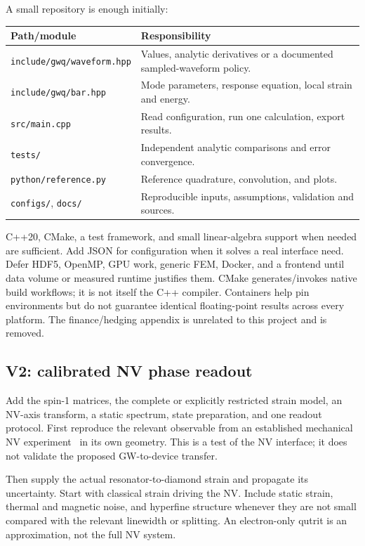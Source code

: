\documentclass[a4paper,11pt]{article}
\newcommand{\code}[1]{\texttt{#1}}
\begin{document}
A small repository is enough initially:

\begin{tabularx}{\textwidth}{@{}P{52mm}X@{}}\toprule
Path/module & Responsibility\\\midrule
\code{include/gwq/waveform.hpp} & Values, analytic derivatives or a documented sampled-waveform policy.\\
\code{include/gwq/bar.hpp} & Mode parameters, response equation, local strain and energy.\\
\code{src/main.cpp} & Read configuration, run one calculation, export results.\\
\code{tests/} & Independent analytic comparisons and error convergence.\\
\code{python/reference.py} & Reference quadrature, convolution, and plots.\\
\code{configs/}, \code{docs/} & Reproducible inputs, assumptions, validation and sources.\\
\bottomrule\end{tabularx}

C++20, CMake, a test framework, and small linear-algebra support when needed are sufficient. Add JSON for configuration when it solves a real interface need. Defer HDF5, OpenMP, GPU work, generic FEM, Docker, and a frontend until data volume or measured runtime justifies them. CMake generates/invokes native build workflows; it is not itself the C++ compiler. Containers help pin environments but do not guarantee identical floating-point results across every platform. The finance/hedging appendix is unrelated to this project and is removed.

\subsection{V2: calibrated NV phase readout}

Add the spin-1 matrices, the complete or explicitly restricted strain model, an NV-axis transform, a static spectrum, state preparation, and one readout protocol. First reproduce the relevant observable from an established mechanical NV experiment~\cite{ovart,teissier,macquarrie,barfuss} in its own geometry. This is a test of the NV interface; it does not validate the proposed GW-to-device transfer.

Then supply the actual resonator-to-diamond strain and propagate its uncertainty. Start with classical strain driving the NV. Include static strain, thermal and magnetic noise, and hyperfine structure whenever they are not small compared with the relevant linewidth or splitting. An electron-only qutrit is an approximation, not the full NV system.
\end{document}
